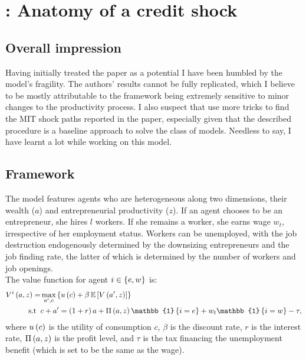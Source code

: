 \documentclass[12pt, leqno]{article}
\begin{document}
\section{\citet{buera_anatomy_2015}: Anatomy of a credit shock}
\subsection{Overall impression}
Having initially treated the paper as a potential  I have been humbled by the model's fragility. 
The authors' results cannot be fully replicated, which I believe to be mostly attributable to the framework being extremely sensitive to minor changes to the productivity process. 
I also suspect that \citet{buera_anatomy_2015} use more tricks to find the MIT shock paths reported in the paper, especially given that the described procedure is a baseline approach to solve the \citet{aiyagari_uninsured_1994} class of models.
Needless to say, I have learnt a lot while working on this model. 

\subsection{Framework}
The model features agents who are heterogeneous along two dimensions, their wealth ($a$) and entrepreneurial productivity ($z$).
If an agent chooses to be an entrepreneur, she hires $l$ workers. 
If she remains a worker, she earns wage $w_t$, irrespective of her employment status.
Workers can be unemployed, with the job destruction endogenously determined by the downsizing entrepreneurs and the job finding rate, the latter of which is determined by the number of workers and job openings. \\

The value function for agent $i \in \left\lbrace e,w \right\rbrace$ is:
\begin{equation} \label{eq:buera_value}
    \begin{aligned}
        V^i\bp{a,z} = &  \max_{a',c} \bc{u\bp{c} + \beta \E \bs{V\bp{a',z}} } \\
        \text{s.t} \; \; & c + a' = \bp{1+r}a + \Pi\bp{a,z} \mathbb{1}\bc{i=e}+ w_t \mathbb{1}\bc{i=w} - \tau, 
    \end{aligned}
\end{equation}
where $u\left( c \right)$ is the utility of consumption $c$, $\beta$ is the discount rate, $r$ is the interest rate, $\Pi\left( a,z \right)$ is the profit level, and $\tau$ is the tax financing the unemployment benefit (which is set to be the same as the wage).\\
\end{document}
